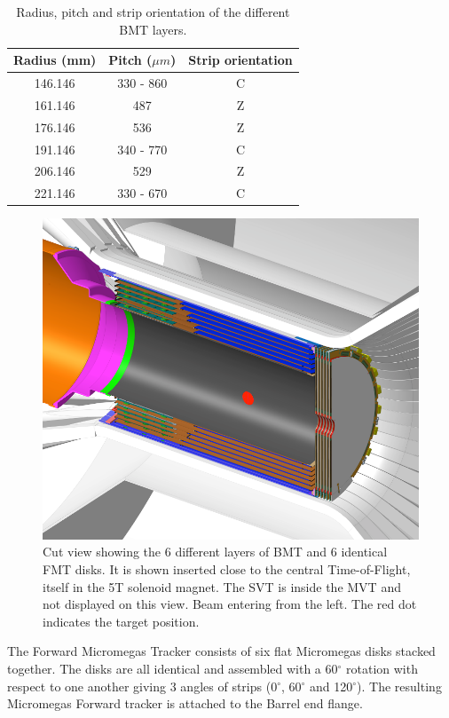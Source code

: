 \begin{table}
    \centering
    \begin{tabular}{|c|c|c|}
    \hline
    Radius (mm) & Pitch ($\mu m$) & Strip orientation \\
    \hline
    146.146 & 330 - 860 & C \\
    161.146 & 487 & Z \\
    176.146 & 536 & Z \\
    191.146 & 340 - 770 & C \\
    206.146 & 529 & Z \\
    221.146 & 330 - 670 & C \\
    \hline
    \end{tabular}
    \caption{Radius, pitch and strip orientation of the different BMT layers.}
\end{table}
\begin{figure}[htb]
 \includegraphics[width=1.0\columnwidth,keepaspectratio]{images/fig1}
 \caption{Cut view showing the 6 different layers of BMT and 6 identical FMT disks. It is shown inserted close to the central Time-of-Flight, itself in the 5T solenoid magnet. The SVT is inside the MVT and not displayed on this view. Beam entering from the left. The red dot indicates the target position.}
 \label{fig:mm-fig1}
\end{figure}

The Forward Micromegas Tracker consists of six flat Micromegas disks stacked together. The disks are all identical and assembled with a 60$^{\circ}$ rotation with respect to one another giving 3 angles of strips (0$^{\circ}$, 60$^{\circ}$ and 120$^{\circ}$). The resulting Micromegas Forward tracker is attached to the Barrel end flange. 

